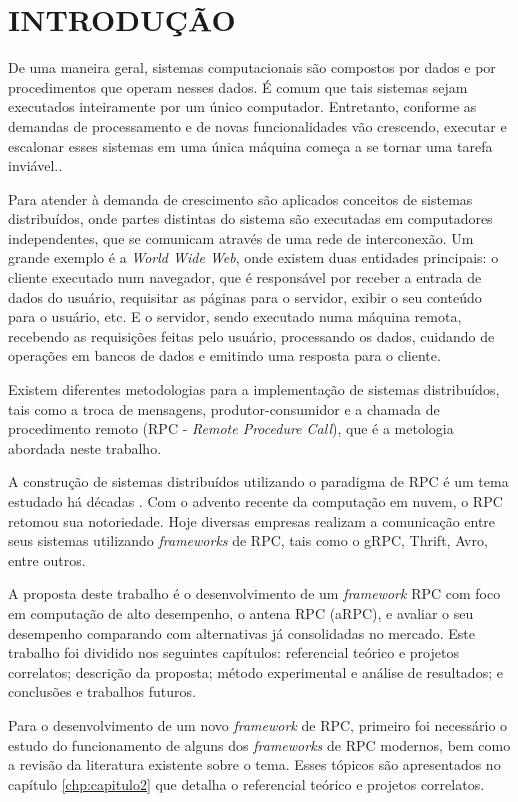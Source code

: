 \chapter{INTRODUÇÃO}
\label{chp:capitulo1}

De uma maneira geral, sistemas computacionais são compostos por dados e por procedimentos que operam nesses dados. É comum que tais sistemas sejam executados inteiramente por um único computador. Entretanto, conforme as demandas de processamento e de novas funcionalidades vão crescendo, executar e escalonar esses sistemas em uma única máquina começa a se tornar uma tarefa inviável.\cite{ord_neuman_scale_1994}. 

Para atender à demanda de crescimento são aplicados conceitos de sistemas distribuídos, onde partes distintas do sistema são executadas em computadores independentes, que se comunicam através de uma rede de interconexão. Um grande exemplo é a \textit{World Wide Web}, onde existem duas entidades principais: o cliente executado num navegador, que é responsável por receber a entrada de dados do usuário, requisitar as páginas para o servidor, exibir o seu conteúdo para o usuário, etc. E o servidor, sendo executado numa máquina remota, recebendo as requisições feitas pelo usuário, processando os dados, cuidando de operações em bancos de dados e emitindo uma resposta para o cliente.

Existem diferentes metodologias para a implementação de sistemas distribuídos, tais como a troca de mensagens, produtor-consumidor e a chamada de procedimento remoto (RPC - \textit{Remote Procedure Call}), que é a metologia abordada neste trabalho.

A construção de sistemas distribuídos utilizando o paradigma de RPC é um tema estudado há décadas \cite{nelson_remote_1981}. Com o advento recente da computação em nuvem, o RPC retomou sua notoriedade. Hoje diversas empresas realizam a comunicação entre seus sistemas utilizando \textit{frameworks} de RPC, tais como o gRPC, Thrift, Avro, entre outros.

A proposta deste trabalho é o desenvolvimento de um \textit{framework} RPC com foco em computação de alto desempenho, o antena RPC (aRPC), e avaliar o seu desempenho comparando com alternativas já consolidadas no mercado. Este trabalho foi dividido nos seguintes capítulos: referencial teórico e projetos correlatos; descrição da proposta; método experimental e análise de resultados; e conclusões e trabalhos futuros. 

Para o desenvolvimento de um novo \textit{framework} de RPC, primeiro foi necessário o estudo do funcionamento de alguns dos \textit{frameworks} de RPC modernos, bem como a revisão da literatura existente sobre o tema. Esses tópicos são apresentados no capítulo \ref{chp:capitulo2} que detalha o referencial teórico e projetos correlatos.

